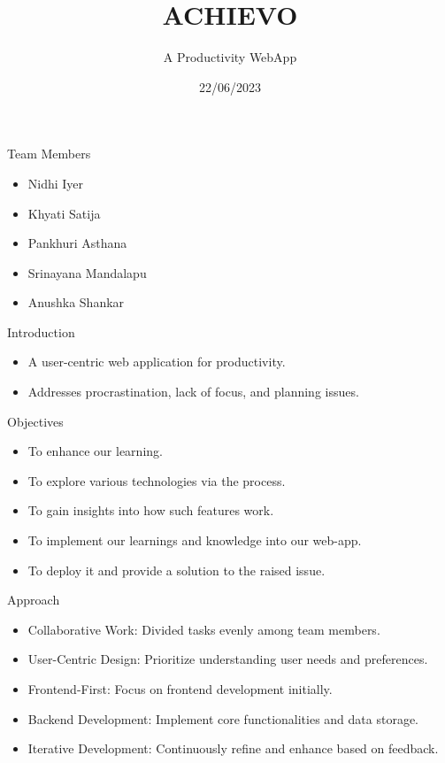 \documentclass{beamer}
\title{ACHIEVO}
\subtitle{A Productivity WebApp}
\institute[Program]{
        \inst{Women Engineers}
        \inst{TalentSprint}
}
\date{22/06/2023}
\begin{document}
\begin{frame}
  \maketitle
\end{frame}

\begin{frame}{Team Members}
    \begin{itemize}
        \item Nidhi Iyer
        \item Khyati Satija
        \item Pankhuri Asthana
        \item Srinayana Mandalapu
        \item Anushka Shankar
    \end{itemize}
\end{frame}

\begin{frame}{Introduction}
    \begin{itemize}
        \item A user-centric web application for productivity.
        \item Addresses procrastination, lack of focus, and planning issues.
    \end{itemize}
\end{frame}

\begin{frame}{Objectives}
    \begin{itemize}
        \item To enhance our learning.
        \item To explore various technologies via the process.
        \item To gain insights into how such features work.
        \item To implement our learnings and knowledge into our web-app.
        \item To deploy it and provide a solution to the raised issue.
    \end{itemize}
\end{frame}

\begin{frame}{Approach}
    \begin{itemize}
        \item Collaborative Work: Divided tasks evenly among team members.
        \item User-Centric Design: Prioritize understanding user needs and preferences.
        \item Frontend-First: Focus on frontend development initially.
        \item Backend Development: Implement core functionalities and data storage.
        \item Iterative Development: Continuously refine and enhance based on feedback.
    \end{itemize}
\end{frame}
\end{document}
